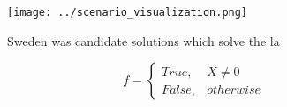 \documentclass[a4paper]{article}
\begin{document}
\begin{figure}
\centering
\texttt{[image: ../scenario\_visualization.png]}
\caption{Sweden was candidate solutions which solve the la
}
\end{figure}
 
\begin{equation}   f =
\begin{cases} True, & X \neq 0\\
False, & otherwise
\end{cases}
\end{equation}
\end{document}
